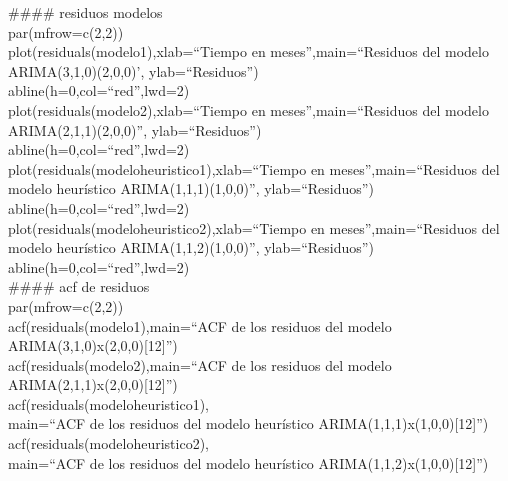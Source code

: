 \documentclass{report}
\begin{document}
\#\#\#\# residuos modelos\\
par(mfrow=c(2,2))\\
plot(residuals(modelo1),xlab=``Tiempo en meses'',main=``Residuos del modelo ARIMA(3,1,0)(2,0,0)',
     ylab=``Residuos'')\\
abline(h=0,col=``red'',lwd=2)\\

plot(residuals(modelo2),xlab=``Tiempo en meses'',main=``Residuos del modelo ARIMA(2,1,1)(2,0,0)'',
     ylab=``Residuos'')\\
abline(h=0,col=``red'',lwd=2)\\

plot(residuals(modeloheuristico1),xlab=``Tiempo en meses'',main=``Residuos del modelo heurístico ARIMA(1,1,1)(1,0,0)'',
     ylab=``Residuos'')\\
abline(h=0,col=``red'',lwd=2)\\

plot(residuals(modeloheuristico2),xlab=``Tiempo en meses'',main=``Residuos del modelo heurístico ARIMA(1,1,2)(1,0,0)'',
     ylab=``Residuos'')
abline(h=0,col=``red'',lwd=2)\\

\#\#\#\# acf de residuos\\
par(mfrow=c(2,2))\\
acf(residuals(modelo1),main=``ACF de los residuos del modelo ARIMA(3,1,0)x(2,0,0)[12]'')\\
acf(residuals(modelo2),main=``ACF de los residuos del modelo ARIMA(2,1,1)x(2,0,0)[12]'')\\
acf(residuals(modeloheuristico1),\\
main=``ACF de los residuos del modelo heurístico ARIMA(1,1,1)x(1,0,0)[12]'')\\
acf(residuals(modeloheuristico2),\\
main=``ACF de los residuos del modelo heurístico ARIMA(1,1,2)x(1,0,0)[12]'')\\
\end{document}
